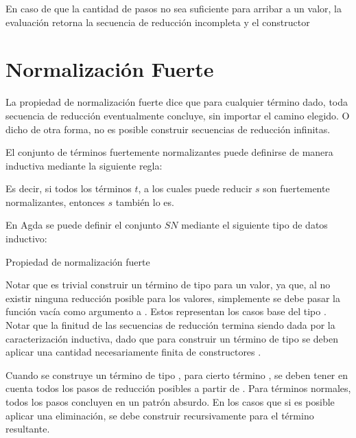\begin{example}
	En caso de que la cantidad de pasos no sea suficiente para arribar a un valor, la evaluación retorna la secuencia de reducción incompleta y el constructor 
\end{example}

\section{Normalización Fuerte}

La propiedad de normalización fuerte dice que para cualquier término dado, toda secuencia de reducción eventualmente concluye, sin importar el camino elegido.
O dicho de otra forma, no es posible construir secuencias de reducción infinitas.

El conjunto de términos fuertemente normalizantes puede definirse de manera inductiva mediante la siguiente regla:

\begin{center}
	\begin{prooftree}
	\end{prooftree}
\end{center}

Es decir, si todos los términos $t$, a los cuales puede reducir $s$ son fuertemente normalizantes, entonces $s$ también lo es. 

En Agda se puede definir el conjunto $SN$ mediante el siguiente tipo de datos inductivo: 

\begin{codigo}
	Propiedad de normalización fuerte
\end{codigo}

Notar que es trivial construir un término de tipo  para un valor, ya que, al no existir ninguna reducción posible para los valores, simplemente se debe pasar la función vacía como argumento a .
Estos representan los casos base del tipo .
Notar que la finitud de las secuencias de reducción termina siendo dada por la caracterización inductiva, dado que para construir un término de tipo  se deben aplicar una cantidad necesariamente finita de constructores .

\begin{example}
	Cuando se construye un término de tipo  , para cierto término , se deben tener en cuenta todos los pasos de reducción posibles a partir de .
	Para términos normales, todos los pasos concluyen en un patrón absurdo.
	En los casos que si es posible aplicar una eliminación, se debe construir recursivamente  para el término resultante.
	
\end{example}

